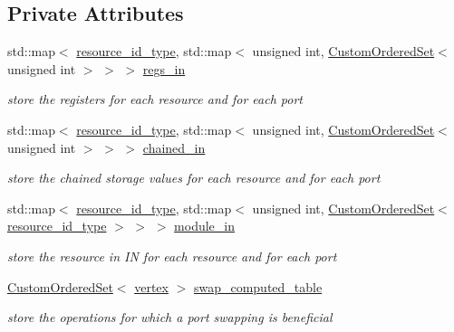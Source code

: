 \subsection*{Private Attributes}
\begin{DoxyCompactItemize}
\item 
std\+::map$<$ \hyperlink{classmux__connection__binding_aa43c7eaf66a55ac97a5a7f57f6149025}{resource\+\_\+id\+\_\+type}, std\+::map$<$ unsigned int, \hyperlink{classCustomOrderedSet}{Custom\+Ordered\+Set}$<$ unsigned int $>$ $>$ $>$ \hyperlink{classmux__connection__binding_ae2887fd8b2a2ac2f821b88ee5b72645c}{regs\+\_\+in}
\begin{DoxyCompactList}\small\item\em store the registers for each resource and for each port \end{DoxyCompactList}\item 
std\+::map$<$ \hyperlink{classmux__connection__binding_aa43c7eaf66a55ac97a5a7f57f6149025}{resource\+\_\+id\+\_\+type}, std\+::map$<$ unsigned int, \hyperlink{classCustomOrderedSet}{Custom\+Ordered\+Set}$<$ unsigned int $>$ $>$ $>$ \hyperlink{classmux__connection__binding_a6a7f00a750edd58786915ba407f4fc0c}{chained\+\_\+in}
\begin{DoxyCompactList}\small\item\em store the chained storage values for each resource and for each port \end{DoxyCompactList}\item 
std\+::map$<$ \hyperlink{classmux__connection__binding_aa43c7eaf66a55ac97a5a7f57f6149025}{resource\+\_\+id\+\_\+type}, std\+::map$<$ unsigned int, \hyperlink{classCustomOrderedSet}{Custom\+Ordered\+Set}$<$ \hyperlink{classmux__connection__binding_aa43c7eaf66a55ac97a5a7f57f6149025}{resource\+\_\+id\+\_\+type} $>$ $>$ $>$ \hyperlink{classmux__connection__binding_abe3e45c29632c3aa4629f55195c3990e}{module\+\_\+in}
\begin{DoxyCompactList}\small\item\em store the resource in IN for each resource and for each port \end{DoxyCompactList}\item 
\hyperlink{classCustomOrderedSet}{Custom\+Ordered\+Set}$<$ \hyperlink{graph_8hpp_abefdcf0544e601805af44eca032cca14}{vertex} $>$ \hyperlink{classmux__connection__binding_aca8cadda839b8ce1a7274ef6ec437603}{swap\+\_\+computed\+\_\+table}
\begin{DoxyCompactList}\small\item\em store the operations for which a port swapping is beneficial \end{DoxyCompactList}\item 

\end{DoxyCompactItemize}
